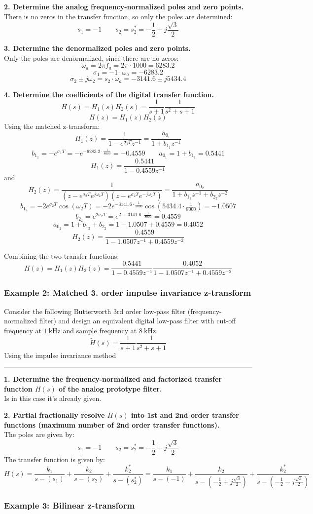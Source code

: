 \textbf{2. Determine the analog frequency-normalized poles and zero points.}\\
There is no zeros in the transfer function, so only the poles are determined:
$$s_1=-1 \qquad s_2=s_2^*=-\frac{1}{2}+j\frac{\sqrt{3}}{2}$$

\textbf{3. Determine the denormalized poles and zero points.}\\
Only the poles are denormalized, since there are no zeros:
$$\omega_a=2\pi f_a=2\pi\cdot 1000=6283.2$$
$$\sigma_1=-1\cdot\omega_a=-6283.2$$
$$\sigma_2\pm j\omega_2=s_2\cdot\omega_a=-3141.6\pm j5434.4$$

\textbf{4. Determine the coefficients of the digital transfer function.}
$$H(s)=H_1(s)H_2(s)=\frac{1}{s+1}\frac{1}{s^{2}+s+1}$$
$$H(z)=H_1(z)H_2(z)$$
Using the matched z-transform:
$$H_1(z)=\frac{1}{1-e^{\sigma_1 T}z^{-1}}=\frac{a_{0_1}}{1+b_{1_1}z^{-1}}$$
$$b_{1_1}=-e^{\sigma_1 T}=-e^{-6283.2\cdot\frac{1}{8000}}=-0.4559\qquad a_{0_1}=1+b_{1_1}=0.5441$$
$$H_1(z)=\frac{0.5441}{1-0.4559z^{-1}}$$
and
$$H_2(z)={\frac{1}{(z-e^{\sigma_{2}T}e^{j\omega_{2}T})(z-e^{\sigma_{2}T}e^{-j\omega_{2}T})}}=\frac{a_{0_2}}{1+b_{1_2}z^{-1}+b_{2_2}z^{-2}}$$
$$b_{1_2}=-2e^{\sigma_2 T}\cos(\omega_2 T)=-2e^{-3141.6\cdot\frac{1}{8000}}\cos(5434.4\cdot\tfrac{1}{8000})=-1.0507$$
$$b_{2_2}=e^{2\sigma_2 T}=e^{2\cdot -3141.6\cdot\frac{1}{8000}}=0.4559$$
$$a_{0_2}=1+b_{1_2}+b_{2_2}=1-1.0507+0.4559=0.4052$$
$$H_2(z)=\frac{0.4559}{1-1.0507z^{-1}+0.4559z^{-2}}$$

Combining the two transfer functions:
$$H(z)=H_1(z)H_2(z)=\frac{0.5441}{1-0.4559z^{-1}}\frac{0.4052}{1-1.0507z^{-1}+0.4559z^{-2}}$$

\subsubsection{Example 2: Matched 3. order impulse invariance z-transform}
Consider the following Butterworth 3rd order low-pass filter (frequency-normalized filter) 
and design an equivalent digital low-pass filter with cut-off frequency at $\SI{1}{\kilo\hertz}$ and sample frequency at $\SI{8}{\kilo\hertz}$. 
$${\tilde{H}}(s)=\frac{1}{s+1}\frac{1}{s^{2}+s+1}$$
Using the impulse invariance method

\noindent\rule{\textwidth}{1pt}

\textbf{1. Determine the frequency-normalized and factorized transfer function $H(s)$ of the analog prototype filter.}\\
Is in this case it's already given.

\textbf{2. Partial fractionally resolve $H(s)$ into 1st and 2nd order transfer functions (maximum number of 2nd order transfer functions).}\\
The poles are given by:
$$s_1=-1 \qquad s_2=s_2^*=-\frac{1}{2}+j\frac{\sqrt{3}}{2}$$
The transfer function is given by:
$$H(s)=\frac{k_1}{s-(s_1)}+\frac{k_2}{s-(s_2)}+\frac{k_2^*}{s-(s_2^*)}=\frac{k_1}{s-(-1)}+\frac{k_2}{s-(-\frac{1}{2}+j\frac{\sqrt{3}}{2})}+\frac{k_2^*}{s-(-\frac{1}{2}-j\frac{\sqrt{3}}{2})}$$
\subsubsection{Example 3: Bilinear z-transform}
